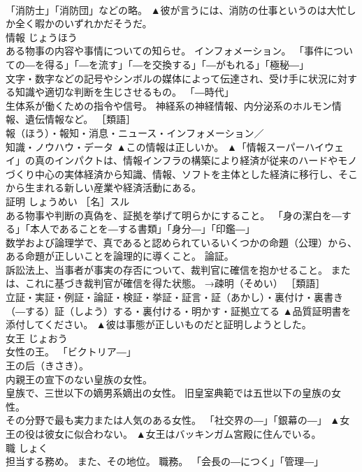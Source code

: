 \documentclass[8pt]{extreport}
\begin{document}
\begin{CJK}{UTF8}{min}
\\	「消防士」「消防団」などの略。	▲彼が言うには、消防の仕事というのは大忙しか全く暇かのいずれかだそうだ。
\\	情報	じょうほう	
\\	ある物事の内容や事情についての知らせ。 インフォメーション。 「事件についての―を得る」「―を流す」「―を交換する」「―がもれる」「極秘―」 
\\	文字・数字などの記号やシンボルの媒体によって伝達され、受け手に状況に対する知識や適切な判断を生じさせるもの。 「―時代」 
\\	生体系が働くための指令や信号。 神経系の神経情報、内分泌系のホルモン情報、遺伝情報など。 ［類語］
\\	報（ほう）・報知・消息・ニュース・インフォメーション／
\\	知識・ノウハウ・データ	▲この情報は正しいか。 ▲「情報スーパーハイウェイ」の真のインパクトは、情報インフラの構築により経済が従来のハードやモノづくり中心の実体経済から知識、情報、ソフトを主体とした経済に移行し、そこから生まれる新しい産業や経済活動にある。
\\	証明	しょうめい	［名］スル 
\\	ある物事や判断の真偽を、証拠を挙げて明らかにすること。 「身の潔白を―する」「本人であることを―する書類」「身分―」「印鑑―」 
\\	数学および論理学で、真であると認められているいくつかの命題（公理）から、ある命題が正しいことを論理的に導くこと。 論証。 
\\	訴訟法上、当事者が事実の存否について、裁判官に確信を抱かせること。 または、これに基づき裁判官が確信を得た状態。 →疎明（そめい） ［類語］
\\	立証・実証・例証・論証・検証・挙証・証言・証（あかし）・裏付け・裏書き（―する）証（しよう）する・裏付ける・明かす・証拠立てる	▲品質証明書を添付してください。 ▲彼は事態が正しいものだと証明しようとした。
\\	女王	じょおう	
\\	女性の王。 「ビクトリア―」 
\\	王の后（きさき）。 
\\	内親王の宣下のない皇族の女性。 
\\	皇族で、三世以下の嫡男系嫡出の女性。 旧皇室典範では五世以下の皇族の女性。 
\\	その分野で最も実力または人気のある女性。 「社交界の―」「銀幕の―」	▲女王の役は彼女に似合わない。 ▲女王はバッキンガム宮殿に住んでいる。
\\	職	しょく	
\\	担当する務め。 また、その地位。 職務。 「会長の―につく」「管理―」 

\end{CJK}
\end{document}
